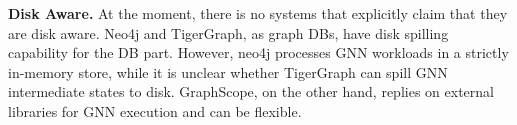 \vspace{2mm}
\noindent \textbf{Disk Aware.} At the moment, there is no systems that explicitly claim that they are disk aware. Neo4j and TigerGraph, as graph DBs, have disk spilling capability for the DB part. However, neo4j processes GNN workloads in a strictly in-memory store, while it is unclear whether TigerGraph can spill GNN intermediate states to disk. GraphScope, on the other hand, replies on external libraries for GNN execution and can be flexible.







